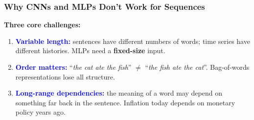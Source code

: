 \documentclass[notes,11pt, aspectratio=169]{beamer}
\begin{document}
\begin{frame}
\frametitle{Why CNNs and MLPs Don't Work for Sequences}

\textbf{Three core challenges:}

\vspace{6pt}
\begin{enumerate}
    \item \textcolor{blue}{\textbf{Variable length:}} sentences have different numbers of words; time series have different histories. MLPs need a \textbf{fixed-size} input.

    \vspace{6pt}
    \item \textcolor{blue}{\textbf{Order matters:}} ``\textit{the cat ate the fish}'' $\neq$ ``\textit{the fish ate the cat}''. Bag-of-words representations lose all structure.

    \vspace{6pt}
    \item \textcolor{blue}{\textbf{Long-range dependencies:}} the meaning of a word may depend on something far back in the sentence. Inflation today depends on monetary policy years ago.
\end{enumerate}

\vspace{12pt}
\end{frame}
\end{document}
